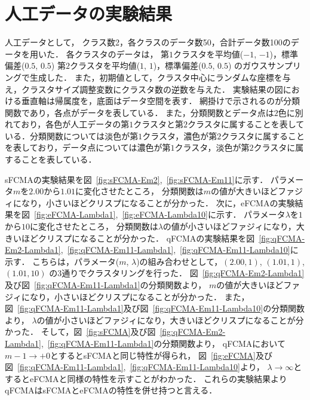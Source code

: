 \documentclass[twocolumn, a4paper]{icethesisabst}
\begin{document}
\section{人工データの実験結果}
人工データとして，
クラス数2，各クラスのデータ数50，合計データ数100のデータを用いた．
各クラスタのデータは，
第$1$クラスタを平均値($-1$, $-1$)，標準偏差($0.5$, $0.5$)
第$2$クラスタを平均値($1$, $1$)，標準偏差($0.5$, $0.5$)
のガウスサンプリングで生成した．
また，初期値として，クラスタ中心にランダムな座標を与え，クラスタサイズ調整変数にクラスタ数の逆数を与えた．
実験結果の図における垂直軸は帰属度を，底面はデータ空間を表す．
網掛けで示されるのが分類関数であり，各点がデータを表している．
また，分類関数とデータ点は$2$色に別れており，各色が人工データの第$1$クラスタと第$2$クラスタに属することを表している．分類関数については淡色が第$1$クラスタ，濃色が第$2$クラスタに属することを表しており，データ点については濃色が第$1$クラスタ，淡色が第$2$クラスタに属することを表している．

sFCMAの実験結果を図~\ref{fig:sFCMA-Em2},~\ref{fig:sFCMA-Em11}に示す．
パラメータ$m$を$2.00$から$1.01$に変化させたところ，
分類関数は$m$の値が大きいほどファジィになり，小さいほどクリスプになることが分かった．
次に，eFCMAの実験結果を図~\ref{fig:eFCMA-Lambda1},~\ref{fig:eFCMA-Lambda10}に示す．
パラメータ$\lambda$を$1$から$10$に変化させたところ，
分類関数は$\lambda$の値が小さいほどファジィになり，大きいほどクリスプになることが分かった．
qFCMAの実験結果を図~\ref{fig:qFCMA-Em2-Lambda1},~\ref{fig:qFCMA-Em11-Lambda1},~\ref{fig:qFCMA-Em11-Lambda10}に示す．
こちらは，パラメータ($m$, $\lambda$)の組み合わせとして，$(2.00, 1)$, $(1.01, 1)$, $(1.01, 10)$
の3通りでクラスタリングを行った．
図~\ref{fig:qFCMA-Em2-Lambda1}及び図~\ref{fig:qFCMA-Em11-Lambda1}の分類関数より，
$m$の値が大きいほどファジィになり，小さいほどクリスプになることが分かった．
また，図~\ref{fig:qFCMA-Em11-Lambda1}及び図~\ref{fig:qFCMA-Em11-Lambda10}の分類関数より，
$\lambda$の値が小さいほどファジィになり，大きいほどクリスプになることが分かった．
そして，図~\ref{fig:sFCMA}及び図~\ref{fig:qFCMA-Em2-Lambda1},~\ref{fig:qFCMA-Em11-Lambda1}の分類関数より，
qFCMAにおいて$m-1\rightarrow+0$とするとsFCMAと同じ特性が得られ，
図~\ref{fig:eFCMA}及び図~\ref{fig:qFCMA-Em11-Lambda1},~\ref{fig:qFCMA-Em11-Lambda10}より，
$\lambda\rightarrow\infty$とするとeFCMAと同様の特性を示すことがわかった．
これらの実験結果よりqFCMAはsFCMAとeFCMAの特性を併せ持つと言える．
\end{document}
